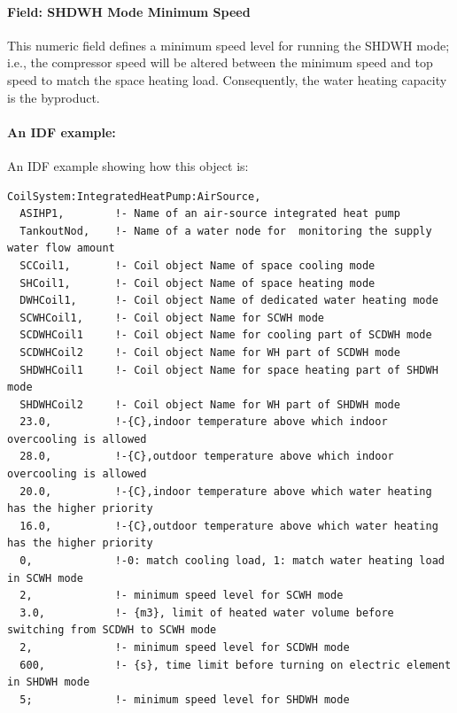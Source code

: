 \paragraph{Field: SHDWH Mode Minimum Speed}\label{Field-SHDWH-Mode-Minimum-Speed-ASIHP}

This numeric field defines a minimum speed level for running the SHDWH mode; i.e., the compressor speed will be altered between the minimum speed and top speed to match the space heating load. Consequently, the water heating capacity is the byproduct.



\paragraph{An IDF example:}\label{FieldIDFExample-ASIHP}


An IDF example showing how this object is:


\begin{lstlisting}
CoilSystem:IntegratedHeatPump:AirSource,
  ASIHP1,        !- Name of an air-source integrated heat pump
  TankoutNod,    !- Name of a water node for  monitoring the supply water flow amount
  SCCoil1,       !- Coil object Name of space cooling mode 
  SHCoil1,       !- Coil object Name of space heating mode 
  DWHCoil1,      !- Coil object Name of dedicated water heating mode 
  SCWHCoil1,     !- Coil object Name for SCWH mode
  SCDWHCoil1     !- Coil object Name for cooling part of SCDWH mode
  SCDWHCoil2     !- Coil object Name for WH part of SCDWH mode
  SHDWHCoil1     !- Coil object Name for space heating part of SHDWH mode
  SHDWHCoil2     !- Coil object Name for WH part of SHDWH mode
  23.0,          !-{C},indoor temperature above which indoor overcooling is allowed
  28.0,          !-{C},outdoor temperature above which indoor overcooling is allowed
  20.0,          !-{C},indoor temperature above which water heating has the higher priority
  16.0,          !-{C},outdoor temperature above which water heating has the higher priority
  0,             !-0: match cooling load, 1: match water heating load in SCWH mode
  2,             !- minimum speed level for SCWH mode
  3.0,           !- {m3}, limit of heated water volume before switching from SCDWH to SCWH mode
  2,             !- minimum speed level for SCDWH mode
  600,           !- {s}, time limit before turning on electric element in SHDWH mode
  5;             !- minimum speed level for SHDWH mode
\end{lstlisting}

